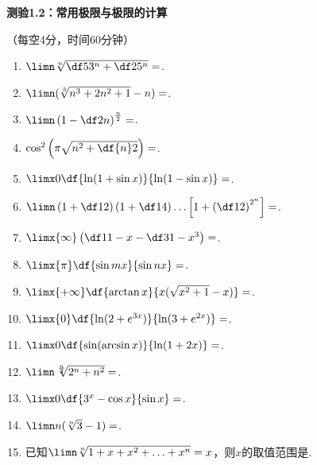 
\begin{center}
	\Large\bf
	测验1.2：常用极限与极限的计算

	\kaishu\small （每空4分，时间60分钟）
\end{center}

\begin{enumerate}
	\item $\limn\sqrt[n]{\df5{3^n}+\df2{5^n}}=$\uline{\hspace*{3cm}}.
	\item $\limn(\sqrt[3]{n^3+2n^2+1}-n)=$\uline{\hspace*{3cm}}.
	\item $\limn\left(1-\df2n\right)^{\frac n2}=$\uline{\hspace*{3cm}}.
	\item $\cos^2\left(\pi\sqrt{n^2+\df{n}2}\right)=$\uline{\hspace*{3cm}}.
	\item $\limx0\df{\ln(1+\sin x)}{\ln(1-\sin x)}=$\uline{\hspace*{3cm}}.
	\item $\limn\left(1+\df12\right)\left(1+\df14\right)
	\ldots\left[1+\left(\df12\right)^{2^n}\right]=$\uline{\hspace*{3cm}}.
	\item $\limx{\infty}\left(\df1{1-x}-\df3{1-x^3}\right)=$\uline{\hspace*{3cm}}.
	\item $\limx{\pi}\df{\sin mx}{\sin nx}=$\uline{\hspace*{3cm}}.
	\item $\limx{+\infty}\df{\arctan x}{x(\sqrt{x^2+1}-x)}=$\uline{\hspace*{3cm}}.
	\item $\limx{0}\df{\ln(2+e^{3x})}{\ln(3+e^{2x})}=$\uline{\hspace*{3cm}}.
	\item $\limx0\df{\sin(\arcsin x)}{\ln(1+2x)}=$\uline{\hspace*{3cm}}.
	\item $\limn\sqrt[\frac n2]{2^n+n^2}=$\uline{\hspace*{3cm}}.
	\item $\limx0\df{3^x-\cos x}{\sin x}=$\uline{\hspace*{3cm}}.
	\item $\limn n(\sqrt[n]{3}-1)=$\uline{\hspace*{3cm}}.
	\item 已知$\limn\sqrt[n]{1+x+x^2+\ldots+x^n}=x$，则$x$的取值范围是\uline{\hspace*{3cm}}.

\end{enumerate}
